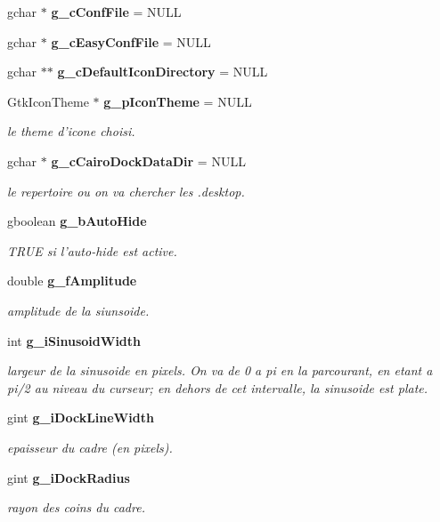 \begin{CompactItemize}
gchar $\ast$ {\bf g\_\-c\-Conf\-File} = NULL
\item 
gchar $\ast$ {\bf g\_\-c\-Easy\-Conf\-File} = NULL
\item 
gchar $\ast$$\ast$ {\bf g\_\-c\-Default\-Icon\-Directory} = NULL
\item 
Gtk\-Icon\-Theme $\ast$ {\bf g\_\-p\-Icon\-Theme} = NULL
\begin{CompactList}\small\item\em le theme d'icone choisi. \item\end{CompactList}\item 
gchar $\ast$ {\bf g\_\-c\-Cairo\-Dock\-Data\-Dir} = NULL
\begin{CompactList}\small\item\em le repertoire ou on va chercher les .desktop. \item\end{CompactList}\item 
gboolean {\bf g\_\-b\-Auto\-Hide}
\begin{CompactList}\small\item\em TRUE si l'auto-hide est active. \item\end{CompactList}\item 
double {\bf g\_\-f\-Amplitude}
\begin{CompactList}\small\item\em amplitude de la siunsoide. \item\end{CompactList}\item 
int {\bf g\_\-i\-Sinusoid\-Width}
\begin{CompactList}\small\item\em largeur de la sinusoide en pixels. On va de 0 a pi en la parcourant, en etant a pi/2 au niveau du curseur; en dehors de cet intervalle, la sinusoide est plate. \item\end{CompactList}\item 
gint {\bf g\_\-i\-Dock\-Line\-Width}
\begin{CompactList}\small\item\em epaisseur du cadre (en pixels). \item\end{CompactList}\item 
gint {\bf g\_\-i\-Dock\-Radius}
\begin{CompactList}\small\item\em rayon des coins du cadre. \item\end{CompactList}\item 
$$
\end{CompactItemize}
